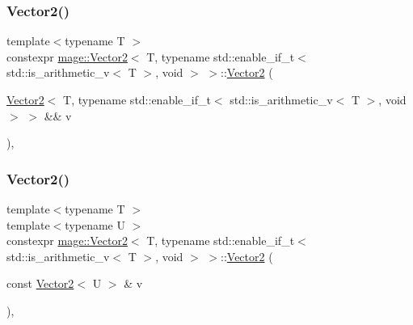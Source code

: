 \subsubsection{\texorpdfstring{Vector2()}{Vector2()}\hspace{0.1cm}{\footnotesize\ttfamily [5/6]}}
{\footnotesize\ttfamily template$<$typename T $>$ \\
constexpr \hyperlink{structmage_1_1_vector2}{mage\+::\+Vector2}$<$ T, typename std\+::enable\+\_\+if\+\_\+t$<$ std\+::is\+\_\+arithmetic\+\_\+v$<$ T $>$, void $>$ $>$\+::\hyperlink{structmage_1_1_vector2}{Vector2} (\begin{DoxyParamCaption}\item[{\hyperlink{structmage_1_1_vector2}{Vector2}$<$ T, typename std\+::enable\+\_\+if\+\_\+t$<$ std\+::is\+\_\+arithmetic\+\_\+v$<$ T $>$, void $>$ $>$ \&\&}]{v }\end{DoxyParamCaption})\hspace{0.3cm}{\ttfamily [default]}, {\ttfamily [noexcept]}}

\hypertarget{structmage_1_1_vector2_3_01_t_00_01typename_01std_1_1enable__if__t_3_01std_1_1is__arithmetic__v_3_01_t_01_4_00_01void_01_4_01_4_ac0d6d975a967b3fbca3bacb8d37fbab4}{}\label{structmage_1_1_vector2_3_01_t_00_01typename_01std_1_1enable__if__t_3_01std_1_1is__arithmetic__v_3_01_t_01_4_00_01void_01_4_01_4_ac0d6d975a967b3fbca3bacb8d37fbab4} 
\subsubsection{\texorpdfstring{Vector2()}{Vector2()}\hspace{0.1cm}{\footnotesize\ttfamily [6/6]}}
{\footnotesize\ttfamily template$<$typename T $>$ \\
template$<$typename U $>$ \\
constexpr \hyperlink{structmage_1_1_vector2}{mage\+::\+Vector2}$<$ T, typename std\+::enable\+\_\+if\+\_\+t$<$ std\+::is\+\_\+arithmetic\+\_\+v$<$ T $>$, void $>$ $>$\+::\hyperlink{structmage_1_1_vector2}{Vector2} (\begin{DoxyParamCaption}\item[{const \hyperlink{structmage_1_1_vector2}{Vector2}$<$ U $>$ \&}]{v }\end{DoxyParamCaption})\hspace{0.3cm}{\ttfamily [explicit]}, {\ttfamily [noexcept]}}

